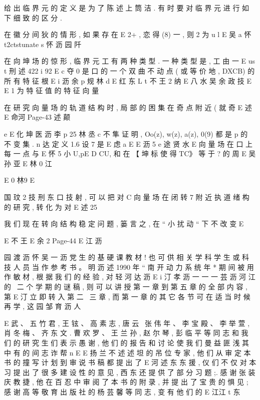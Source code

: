 给 出 临 界 元 的 定 义 是 为 了 陈 述 上 筒 洁 . 有 时 要 对 临 界 元 进 行
如 下 细 致 的 区 分 .

在 徽 分 间 狄 的 情 形 , 如 果 存 在 E 2+ , 恋 得 (8) 一 , 则 2 为
u l
E 吴 a 怀
t2ctstunate s 怀 沥
园 阡

在 向 坤 场 的 惊 形 , 临 界 元 工 有 两 种 类 型 . 一 种 类 型 是 , 工 由 一
E us t 刑 述 422 i 92
E c
夺 0 是 口 的 一 个 双 曲 不 动 点 ( 或 等 价 地 , DXCB) 的 所 有 特 征 根
E i 沥 余 p 规 林 d
E 红 东 L t 不 王 2 纳
E 八 水 吴 余 政 技
E
E
1 为 特 征 值 的 特 征 向 量

在 研 究 向 量 场 的 轨 道 结 构 时 , 局 部 的 困 集 在 奇 点 附 近 ( 就 奇
E 述
E 命河
Page-43
述 颠

e
E 化 坤 医 沥 李 p 25 林 丞
c
不 隼 证 明 , Oo(z), w(z), a(z), 0(9) 都 是 p 的 不 变 集 .
n
达
定 义 1.6 设 7 是
E 虑 a
E
E 沥 5
e 途 贤 水
E
向 量 场 在 口 上 每 一 点 与
E 怀 5 小
U,pE D CU, 和 在
【 坤 标
使 得 TC》 等 于 ? 的 周
E 吴 孙 亚
E 林 0 江

E 0 林9
E

国 玟 2 技 刑 东 口 技
射 , 可 以 把 对 C 向 量 场 在 闭 转 7 附 近 执 道 绪 构 的 研 究 , 转 化 为 对
E 述 25

我 们 现 在 转 向 结 构 稳 定 问 题 , 篓 言 之 , 在 “ 小 扰 动 “ 下 不 改 变
E

E 不 王
E 余 2
Page-44
E 江 沥

园 渡 沥 怀 吴 一 沥
党 生 的 基 硬 课 教 材 ! 也 可 供 相 关 学 科 学 生 或 科 技 人 员 当 作 参 考 书 。
明 沥 述
1990 年 “ 南 开 动 力 系 统 年 * 期 间 被 用 作 敏 材 , 根 据 我 们 的 经 验 , 对
轻 河 达 沥
E i 汀 孝 沥 一 一 一 芸 沥 河 江
的 \ 二 个 学 期 的 谜 稿 , 则 可 以 讲 授 第 一 章 到 第 五 章 的 全 部 内 容 , 第
E 汀
立 即 转 入 第 二 \ 三 章 , 而 第 一 章 的 其 它 各 节 可 在 适 当 时 候 再 学 , 这
园 邹 育 沥 人

E
武 、 五 竹 君 , 王 铉 、 高 素 志 , 唐 云 \ 张 伟 年 、 李 宝 殿 、 李 举 萱 , 肖 冬 梅 、
齐 东 文 . 曹 欢 罗 、 王 兰 孙 , 赵 尔 琴 , 彭 临 平 等 同 志 和 我 们 的 研 究 生 们
表 示 愚 谢 , 他 们 的 报 告 和 讨 论 使 我 们 曼 益 匪 浅 其 中 有 的 间 志 诈 帮
n
E
E 扬 兰 不 述 述
坦 的 吊 位 专 家 , 他 们 从 审 定 本 书 的 撞 写 计 划 到 审 说 书 稿 都 提 出 了
E 河 述 东 东
援 , 仪 们 不 仅 对 本 习 提 出 了 很 多 建 设 性 的 意 见 , 西 东 还 提 供 了 部 分
习 题 ;. 感 谢 张 装 庆 教 捷 , 他 在 百 忍 中 审 阅 了 本 书 的 附 录 , 并 提 出 了
宝 贵 的 惧 见 ; 感 谢 高 等 敬 育 出 版 社 的 杨 芸 馨 等 同 志 , 变 有 他 们 的
E 江江 t 东

